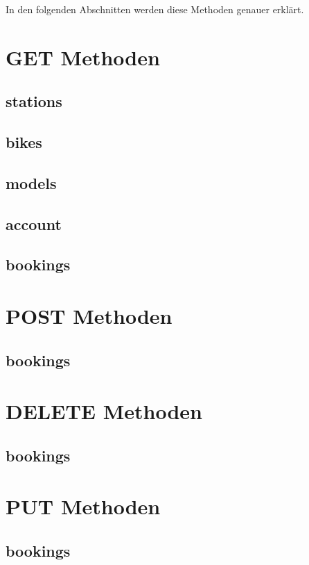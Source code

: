 In den folgenden Abschnitten werden diese Methoden genauer erklärt.

\section{GET Methoden}
\subsection{stations}

\subsection{bikes}

\subsection{models}

\subsection{account}

\subsection{bookings}

\section{POST Methoden}
\subsection{bookings}

\section{DELETE Methoden}
\subsection{bookings}

\section{PUT Methoden}
\subsection{bookings}


